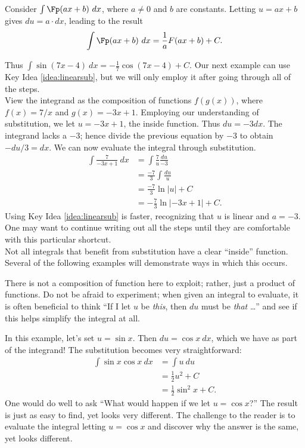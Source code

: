 {Consider $\int \Fp(ax+b)\ dx$, where $a\neq 0$ and $b$ are constants. Letting $u = ax+b$ gives $du = a\cdot dx$, leading to the result
$$\int \Fp(ax+b)\ dx = \frac{1}{a}F(ax+b) + C.$$
}

Thus $\int \sin (7x-4)\ dx = -\frac17\cos(7x-4)+C$. Our next example can use Key Idea \ref{idea:linearsub}, but we will only employ it after going through all of the steps.\\

{View the integrand as the composition of functions $f(g(x))$, where $f(x) = 7/x$ and $g(x) = -3x+1$. Employing our understanding of substitution, we let $u = -3x+1$, the inside function. Thus $du = -3dx$. The integrand lacks a $-3$; hence divide the previous equation by $-3$ to obtain $-du/3 = dx$. We can now evaluate the integral through substitution.
\begin{align*}
	\int \frac{7}{-3x+1}\ dx &=	\int \frac{7}{u}\frac{du}{-3} \\
												&= \frac{-7}3\int \frac{du}{u} \\
												&=	\frac{-7}3\ln |u| + C\\
												&=-\frac73\ln|-3x+1| + C.
\end{align*}
Using Key Idea \ref{idea:linearsub} is faster, recognizing that $u$ is linear and $a = -3$. One may want to continue writing out all the steps until they are comfortable with this particular shortcut.
}\\

Not all integrals that benefit from substitution have a clear ``inside'' function. Several of the following examples will demonstrate ways in which this occurs.\\

{There is not a composition of function here to exploit; rather, just a product of functions. Do not be afraid to experiment; when given an integral to evaluate, it is often beneficial to think ``If I let $u$ be \textit{this}, then $du$ must be \textit{that} \ldots'' and see if this helps simplify the integral at all.

In this example, let's set $u = \sin x$. Then $du = \cos x\ dx$, which we have as part of the integrand! The substitution becomes very straightforward:
		\begin{align*}
		\int \sin x\cos x\ dx &=	\int u\ du \\
											&= \frac12u^2+ C \\
											&= \frac12\sin^2 x + C.
		\end{align*}
One would do well to ask ``What would happen if we let $u = \cos x$?'' The result is just as easy to find, yet looks very different. The challenge to the reader is to evaluate the integral letting $u = \cos x$ and discover why the answer is the same, yet looks different.
}\\

